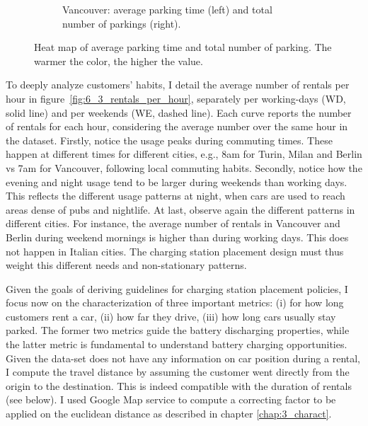 \begin{figure}[t!]
\begin{center}
\begin{subfigure}{\textwidth}
\begin{center}
            \captionsetup{justification=centering}
            \caption{Vancouver: average parking time (left) and total number of parkings (right).}
            \label{fig:6_3_heatmap_vancouver}
            \end{center}
        \end{subfigure}
          \caption{Heat map of average parking time and total number of parking. The warmer the color, the higher the value.}
         \label{fig:6_3_heatmaps}
\end{center}
\end{figure}

To deeply analyze customers' habits, I detail the average number of rentals per hour in figure~\ref{fig:6_3_rentals_per_hour}, separately per working-days (WD, solid line) and per weekends (WE, dashed line). Each curve reports the number of rentals for each hour, considering the average number over the same hour in the dataset.
Firstly, notice the usage peaks during commuting times. These happen at different times for different cities, e.g., 8am for Turin, Milan and Berlin vs 7am for Vancouver, following local commuting habits. Secondly, notice how the evening and night usage tend to be larger during  weekends than working days. This reflects the different usage patterns at night, when cars are used to reach areas dense of pubs and nightlife.
At last, observe again the different patterns in different cities. For instance, the average number of rentals in Vancouver and Berlin during weekend mornings is higher than during working days. This does not happen in Italian cities. The charging station placement design must thus weight this different needs and non-stationary patterns.

Given the goals of deriving guidelines for charging station placement policies, I focus now on the characterization of three important metrics:
(i) for how long customers rent a car,
(ii) how far they drive,
(iii) how long cars usually stay parked.
The former two metrics guide the battery discharging properties, while the latter metric is fundamental to understand battery charging opportunities. Given the data-set does not have any information on car position during a rental, I compute the travel distance by assuming the customer went directly from the origin to the destination. This is indeed compatible with the duration of rentals (see below). I used Google Map service to compute a correcting factor to be applied on the euclidean distance as described in chapter \ref{chap:3_charact}.


